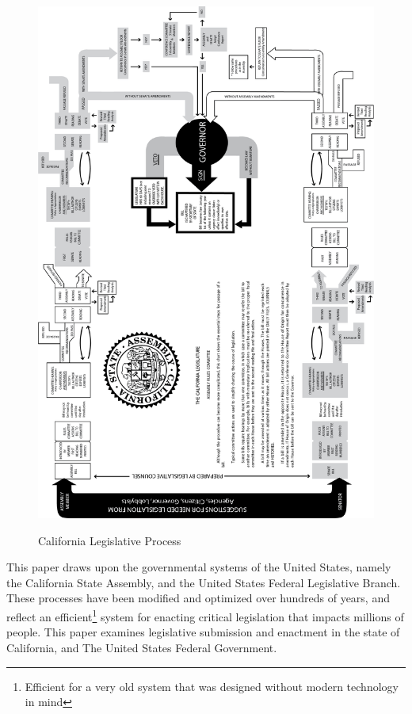\documentclass[letterpaper,twocolumn]{article}
\begin{document}
\begin{figure}\centering
	\includegraphics{figures/ca_leg.png}
	\label{fig:CA_Leg} \caption{California Legislative Process}
\end{figure}

This paper draws upon the governmental systems of the United States, namely the California State Assembly, and the United States Federal Legislative Branch.  These processes have been modified and optimized over hundreds of years, and reflect an efficient\footnote{Efficient for a very old system that was designed without modern technology in mind} system for enacting critical legislation that impacts millions of people.  This paper examines legislative submission and enactment in the state of California, and The United States Federal Government. 
\end{document}
